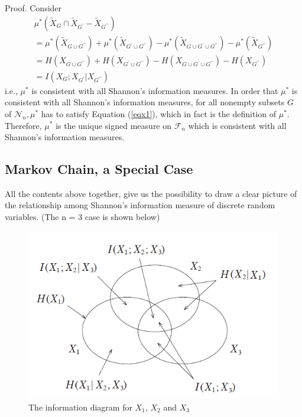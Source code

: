 Proof. Consider
\[
\begin{array}{l}
\mu^{*}\left(\tilde{X}_{G} \cap \tilde{X}_{G^{\prime}}-\tilde{X}_{G^{\prime \prime}}\right) \\
=\mu^{*}\left(\tilde{X}_{G \cup G^{\prime \prime}}\right)+\mu^{*}\left(\tilde{X}_{G^{\prime} \cup G^{\prime \prime}}\right)-\mu^{*}\left(\tilde{X}_{G \cup G^{\prime} \cup G^{\prime \prime}}\right)-\mu^{*}\left(\tilde{X}_{G^{\prime \prime}}\right) \\
=H\left(X_{G \cup G^{\prime \prime}}\right)+H\left(X_{G^{\prime} \cup G^{\prime \prime}}\right)-H\left(X_{G \cup G^{\prime} \cup G^{\prime \prime}}\right)-H\left(X_{G^{\prime \prime}}\right) \\
=I\left(X_{G} ; X_{G^{\prime}} | X_{G^{\prime \prime}}\right)
\end{array}
\]
i.e., $\mu^{*}$ is consistent with all Shannon's information measures. In order that $\mu^{*}$ is consistent with all Shannon's information measures, for all nonempty subsets $G$ of $\mathcal{N}_{n}, \mu^{*}$ has to satisfy Equation (\ref{eqx1}), which in fact is the definition of $\mu^{*}$. Therefore, $\mu^{*}$ is the unique signed measure on $\mathcal{F}_{n}$ which is consistent with all Shannon's information measures.

 \subsection{Markov Chain, a Special Case}
\label{sec:markov}
 
 
 
All the contents above together, give us the possibility to draw a clear picture of the relationship among Shannon's information measure of discrete random variables. (The n = 3 case is shown below)
\begin{figure}[ht]
 
\centering
\includegraphics[scale=0.4]{tex/Im3.png}
\caption{The information diagram for ${X}_{1}$, ${X}_{2}$ and ${X}_{3}$}
\label{im3}
 
\end{figure}


